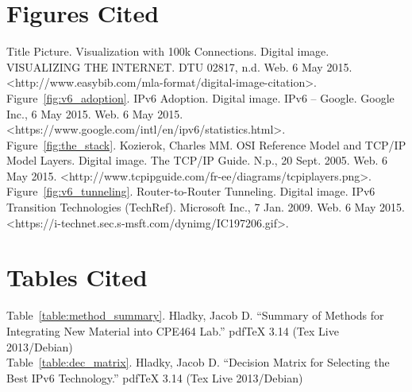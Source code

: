 \documentclass[12pt]{article}
\begin{document}
\section{Figures Cited}

\begin{hangparas}{0.25in}{1}
Title Picture. Visualization with 100k Connections. Digital image. VISUALIZING THE INTERNET. DTU 02817, n.d. Web. 6 May 2015. <http://www.easybib.com/mla-format/digital-image-citation>.\\

Figure~\ref{fig:v6_adoption}. IPv6 Adoption. Digital image. IPv6 -- Google. Google Inc., 6 May 2015. Web. 6 May 2015. <https://www.google.com/intl/en/ipv6/statistics.html>.\\

Figure~\ref{fig:the_stack}. Kozierok, Charles MM. OSI Reference Model and TCP/IP Model Layers. Digital image. The TCP/IP Guide. N.p., 20 Sept. 2005. Web. 6 May 2015. <http://www.tcpipguide.com/fr-ee/diagrams/tcpiplayers.png>.\\

Figure~\ref{fig:v6_tunneling}. Router-to-Router Tunneling. Digital image. IPv6 Transition Technologies (TechRef). Microsoft Inc., 7 Jan. 2009. Web. 6 May 2015. <https://i-technet.sec.s-msft.com/dynimg/IC197206.gif>.
\end{hangparas}

\section{Tables Cited}

\begin{hangparas}{0.25in}{1}
Table~\ref{table:method_summary}. Hladky, Jacob D. ``Summary of Methods for Integrating New Material into CPE464 Lab.'' pdfTeX 3.14 (Tex Live 2013/Debian) \\

Table~\ref{table:dec_matrix}. Hladky, Jacob D. ``Decision Matrix for Selecting the Best IPv6 Technology.'' pdfTeX 3.14 (Tex Live 2013/Debian)
\end{hangparas}

\endgroup
\end{document}
